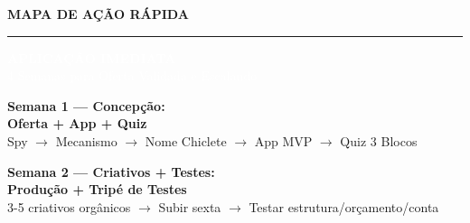 \documentclass[12pt, a4paper]{article}
\begin{document}
\pagebreak

\thispagestyle{empty}
\vspace*{0.5cm}

\begin{center}
    {\Huge \textcolor{primaryColor}{\textbf{MAPA DE AÇÃO RÁPIDA}}} \\
    \vspace{1cm}
    \rule{12cm}{1.5pt}
    \vspace{1cm}

    \colorbox{accentColor}{%
        \parbox{0.92\textwidth}{%
            \centering
            \vspace{0.8cm}
            \textcolor{white}{\Huge \textbf{APLICAÇÃO IMEDIATA}} \\
            \vspace{0.3cm}
            \textcolor{white}{\Large 4 Semanas para Oferta Validada e Escalando} \\
            \vspace{0.8cm}
        }%
    }

    \vspace{1cm}

    \begin{flushleft}
    \large
    \textbf{Semana 1 --- Concepção:} \\
    \vspace{0.3cm}
    \hspace{1cm} \textcolor{accentColor}{\Large \textbf{Oferta + App + Quiz}} \\
    \hspace{1cm} \textcolor{secondaryText}{Spy $\rightarrow$ Mecanismo $\rightarrow$ Nome Chiclete $\rightarrow$ App MVP $\rightarrow$ Quiz 3 Blocos} \\

    \vspace{1cm}

    \textbf{Semana 2 --- Criativos + Testes:} \\
    \vspace{0.3cm}
    \hspace{1cm} \textcolor{accentColor}{\Large \textbf{Produção + Tripé de Testes}} \\
    \hspace{1cm} \textcolor{secondaryText}{3-5 criativos orgânicos $\rightarrow$ Subir sexta $\rightarrow$ Testar estrutura/orçamento/conta} \\

    \vspace{1cm}


\end{flushleft}
\end{center}
\end{document}
